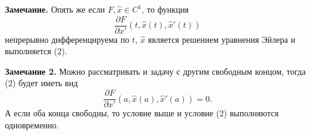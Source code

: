 \QED

\textbf{Замечание.} Опять же если $F, \widehat x \in C^1$, то функция
\[
    \frac{\partial F}{\partial x'}(t, \widehat x(t), \widehat x'(t))
\]
непрерывно дифференцируема по $t$, $\widehat x$ является решением уравнения Эйлера и выполняется (2).

\textbf{Замечание 2.} Можно рассматривать и задачу с другим свободным концом, тогда (2) будет иметь вид
\[
    \frac{\partial F}{\partial x'}(a, \widehat x(a), \widehat x'(a)) = 0.
\]
А если оба конца свободны, то условие выше и условие (2) выполняются одновременно.